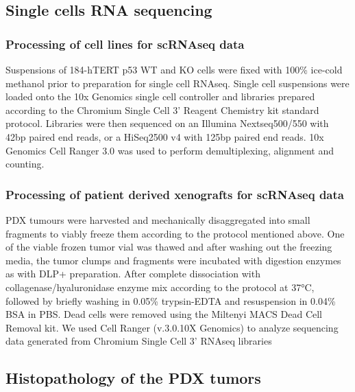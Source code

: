 \documentclass{article}
\begin{document}
\subsection{Single cells RNA sequencing}

\subsubsection{Processing of cell lines for scRNAseq data }
Suspensions of 184-hTERT p53 WT and KO cells were fixed with 100\% ice-cold methanol prior to preparation for single cell RNAseq. 
Single cell suspensions were loaded onto the 10x Genomics single cell controller and libraries prepared according to the Chromium Single Cell 3’ Reagent Chemistry kit standard protocol. 
Libraries were then sequenced on an Illumina Nextseq500/550 with 42bp paired end reads, or a HiSeq2500 v4 with 125bp paired end reads. 
10x Genomics Cell Ranger 3.0 was used to perform demultiplexing, alignment and counting. 

\subsubsection{Processing of patient derived xenografts for scRNAseq data }
PDX tumours were harvested and mechanically disaggregated into small fragments to viably freeze them according to the protocol mentioned above. 
One of the viable frozen tumor vial was thawed and after washing out the freezing media, the tumor clumps and fragments were incubated with digestion enzymes as with DLP+ preparation. 
After complete dissociation with collagenase/hyaluronidase enzyme mix according to the protocol at 37°C, followed by briefly washing in 0.05\% trypsin-EDTA and resuspension in 0.04\% BSA in PBS. 
Dead cells were removed using the Miltenyi MACS Dead Cell Removal kit. 
We used Cell Ranger (v.3.0.10X Genomics) to analyze sequencing data generated from Chromium Single Cell 3’ RNAseq libraries

\subsection{Histopathology of the PDX tumors} 
\end{document}
